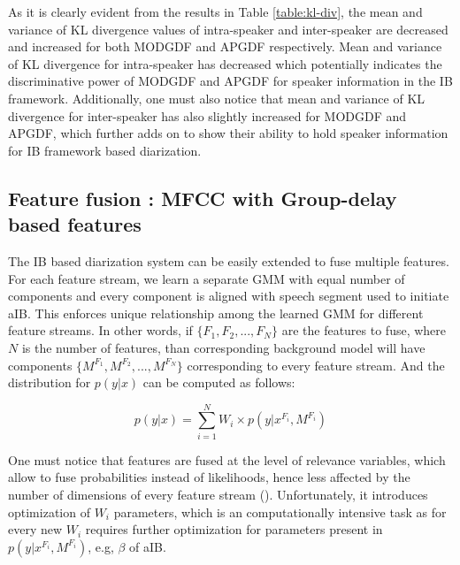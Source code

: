 \documentclass[conference]{IEEEtran}
\begin{document}
As it is clearly evident from the results in Table \ref{table:kl-div}, the mean and variance of KL divergence values of intra-speaker and inter-speaker are decreased and increased for both MODGDF and APGDF respectively. Mean and variance of KL divergence for intra-speaker has decreased which potentially indicates the discriminative power of MODGDF and APGDF for speaker information in the IB framework. Additionally, one must also notice that mean and variance of KL divergence for inter-speaker has also slightly increased for MODGDF and APGDF, which further adds on to show their ability to hold speaker information for IB framework based diarization.  

\subsection{Feature fusion : MFCC with Group-delay based features}

The IB based diarization system can be easily extended to fuse multiple features. For each feature stream, we learn a separate GMM with equal number of components and every component is aligned with speech segment used to initiate aIB. This enforces unique relationship among the learned GMM for different feature streams. In other words, if $\lbrace F_1,F_2,...,F_N \rbrace$ are the features to fuse, where $N$ is the number of features, than corresponding background model will have components $\lbrace M^{F_{1}},M^{F_{2}},...,M^{F_{N}}\rbrace$ corresponding to every feature stream. And the distribution for $p(y|x)$ can be computed as follows:       

\begin{equation}
p(y|x) = \sum _{i=1}^{N} W_i \times p(y|x^{F_{i}},M^{F_{i}})
\label{eq:feat_combs}
\end{equation}

One must notice that features are fused at the level of relevance variables, which allow to fuse probabilities instead of likelihoods, hence less affected by the number of dimensions of every feature stream (\cite{aIB}). Unfortunately, it introduces optimization of $W_i$ parameters, which is an computationally intensive task as for every new $W_i$ requires further optimization for parameters present in $p(y|x^{F_{i}},M^{F_{i}})$, e.g, $\beta$ of aIB.
\end{document}
